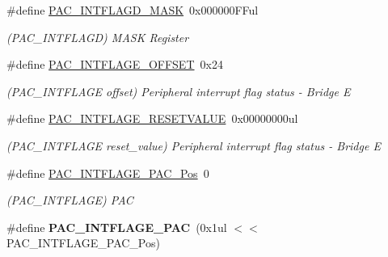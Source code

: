 \begin{DoxyCompactItemize}
\item 
\hypertarget{group___s_a_m_l21___p_a_c_gab3623c4757ea9825019449fc16c83644}{}\#define \hyperlink{group___s_a_m_l21___p_a_c_gab3623c4757ea9825019449fc16c83644}{P\+A\+C\+\_\+\+I\+N\+T\+F\+L\+A\+G\+D\+\_\+\+M\+A\+S\+K}~0x000000\+F\+Ful\label{group___s_a_m_l21___p_a_c_gab3623c4757ea9825019449fc16c83644}

\begin{DoxyCompactList}\small\item\em (P\+A\+C\+\_\+\+I\+N\+T\+F\+L\+A\+G\+D) M\+A\+S\+K Register \end{DoxyCompactList}\item 
\hypertarget{group___s_a_m_l21___p_a_c_gad3e8a4e1a8d3c57a3956a459acf23048}{}\#define \hyperlink{group___s_a_m_l21___p_a_c_gad3e8a4e1a8d3c57a3956a459acf23048}{P\+A\+C\+\_\+\+I\+N\+T\+F\+L\+A\+G\+E\+\_\+\+O\+F\+F\+S\+E\+T}~0x24\label{group___s_a_m_l21___p_a_c_gad3e8a4e1a8d3c57a3956a459acf23048}

\begin{DoxyCompactList}\small\item\em (P\+A\+C\+\_\+\+I\+N\+T\+F\+L\+A\+G\+E offset) Peripheral interrupt flag status -\/ Bridge E \end{DoxyCompactList}\item 
\hypertarget{group___s_a_m_l21___p_a_c_gaeb30b31d604b9542a1234e7ccbb814d6}{}\#define \hyperlink{group___s_a_m_l21___p_a_c_gaeb30b31d604b9542a1234e7ccbb814d6}{P\+A\+C\+\_\+\+I\+N\+T\+F\+L\+A\+G\+E\+\_\+\+R\+E\+S\+E\+T\+V\+A\+L\+U\+E}~0x00000000ul\label{group___s_a_m_l21___p_a_c_gaeb30b31d604b9542a1234e7ccbb814d6}

\begin{DoxyCompactList}\small\item\em (P\+A\+C\+\_\+\+I\+N\+T\+F\+L\+A\+G\+E reset\+\_\+value) Peripheral interrupt flag status -\/ Bridge E \end{DoxyCompactList}\item 
\hypertarget{group___s_a_m_l21___p_a_c_gac7e5af402cf4f0f8829b083d05112613}{}\#define \hyperlink{group___s_a_m_l21___p_a_c_gac7e5af402cf4f0f8829b083d05112613}{P\+A\+C\+\_\+\+I\+N\+T\+F\+L\+A\+G\+E\+\_\+\+P\+A\+C\+\_\+\+Pos}~0\label{group___s_a_m_l21___p_a_c_gac7e5af402cf4f0f8829b083d05112613}

\begin{DoxyCompactList}\small\item\em (P\+A\+C\+\_\+\+I\+N\+T\+F\+L\+A\+G\+E) P\+A\+C \end{DoxyCompactList}\item 
\hypertarget{group___s_a_m_l21___p_a_c_gac614d8807f645a57bacdfbf03c771aeb}{}\#define {\bfseries P\+A\+C\+\_\+\+I\+N\+T\+F\+L\+A\+G\+E\+\_\+\+P\+A\+C}~(0x1ul $<$$<$ P\+A\+C\+\_\+\+I\+N\+T\+F\+L\+A\+G\+E\+\_\+\+P\+A\+C\+\_\+\+Pos)\label{group___s_a_m_l21___p_a_c_gac614d8807f645a57bacdfbf03c771aeb}


\end{DoxyCompactItemize}
